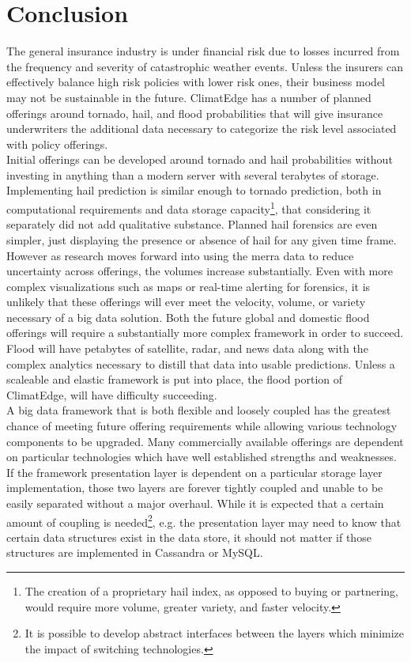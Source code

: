 \section{Conclusion}
The general insurance industry is under financial risk due to losses incurred from the frequency and severity of catastrophic weather events. Unless the insurers can effectively balance high risk policies with lower risk ones, their business model may not be sustainable in the future. ClimatEdge has a number of planned offerings around tornado, hail, and flood probabilities that will give insurance underwriters the additional data necessary to categorize the risk level associated with policy offerings.\\

Initial offerings can be developed around tornado and hail probabilities without investing in anything than a modern server with several terabytes of storage. Implementing hail prediction is similar enough to tornado prediction, both in computational requirements and data storage capacity\footnote{The creation of a proprietary hail index, as opposed to buying or partnering, would require more volume, greater variety, and faster velocity.}, that considering it separately did not add qualitative substance. Planned hail forensics are even simpler, just displaying the presence or absence of hail for any given time frame. However as research moves forward into using the \gls{merra} data to reduce uncertainty across offerings, the volumes increase substantially. Even with more complex visualizations such as maps or real-time alerting for forensics, it is unlikely that these offerings will ever meet the velocity, volume, or variety necessary of a big data solution. Both the future global and domestic flood offerings will require a substantially more complex framework in order to succeed. Flood will have petabytes of satellite, radar, and news data along with the complex analytics necessary to distill that data into usable predictions. Unless a scaleable and elastic framework is put into place, the flood portion of ClimatEdge, will have difficulty succeeding.\\

A big data framework that is both flexible and loosely coupled has the greatest chance of meeting future offering requirements while allowing various technology components to be upgraded. Many commercially available offerings are dependent on particular technologies which have well established strengths and weaknesses. If the framework presentation layer is dependent on a particular storage layer implementation, those two layers are forever tightly coupled and unable to be easily separated without a major overhaul. While it is expected that a certain amount of coupling is needed\footnote{It is possible to develop abstract interfaces between the layers which minimize the impact of switching technologies.}, e.g. the presentation layer may need to know that certain data structures exist in the data store, it should not matter if those structures are implemented in Cassandra or MySQL.\\

